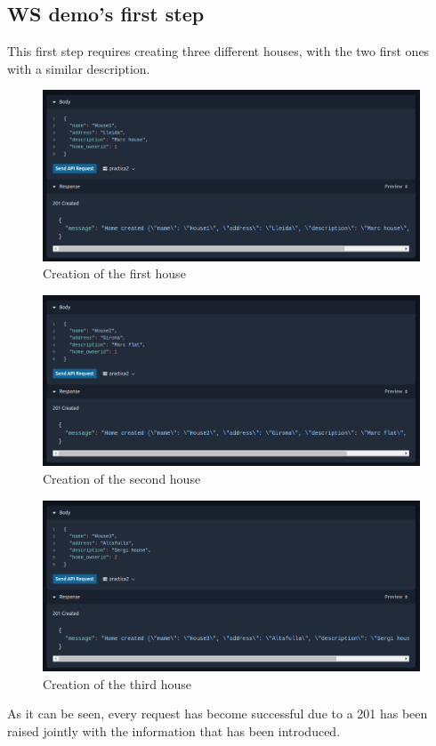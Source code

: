 \documentclass[a4paper,12pt]{article}
\begin{document}
\subsection*{WS demo's first step}
This first step requires creating three different houses, with the two first ones with a similar description.
\begin{figure}[H]
    \centering
    \includegraphics[scale = 0.5]{images/House 1 creation.png}
    \caption{Creation of the first house}
    \label{fig:house1C}
\end{figure}
\begin{figure}[H]
    \centering
    \includegraphics[scale = 0.5]{images/House 2 creation.png}
    \caption{Creation of the second house}
    \label{fig:house2C}
\end{figure}
\begin{figure}[H]
    \centering
    \includegraphics[scale = 0.5]{images/House 3 creation.png}
    \caption{Creation of the third house}
    \label{fig:house3C}
\end{figure}
As it can be seen, every request has become successful due to a 201 has been raised jointly with the information that has been introduced.
\end{document}
